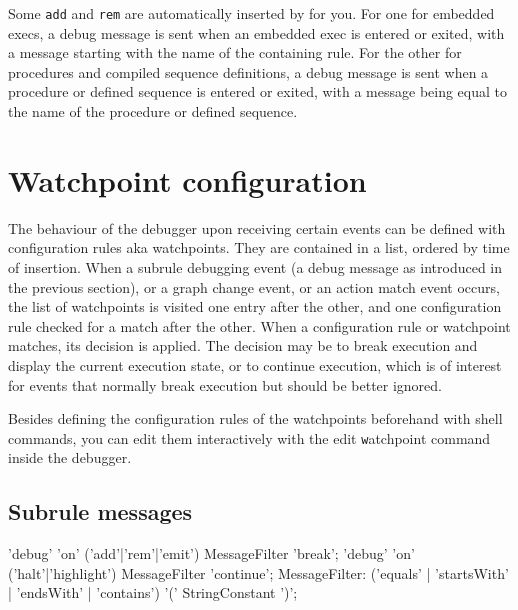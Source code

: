 Some \texttt{add} and \texttt{rem} are automatically inserted by \GrG{} for you.
For one for embedded execs, a debug message is sent when an embedded exec is entered or exited, with a message starting with the name of the containing rule.
For the other for procedures and compiled sequence definitions, a debug message is sent when a procedure or defined sequence is entered or exited, with a message being equal to the name of the procedure or defined sequence.

\section{Watchpoint configuration}

The behaviour of the debugger upon receiving certain events can be defined with configuration rules aka watchpoints.
They are contained in a list, ordered by time of insertion.
When a subrule debugging event (a debug message as introduced in the previous section), or a graph change event, or an action match event occurs,
the list of watchpoints is visited one entry after the other, and one configuration rule checked for a match after the other.
When a configuration rule or watchpoint matches, its decision is applied.
The decision may be to break execution and display the current execution state, or to continue execution, which is of interest for events that normally break execution but should be better ignored.

Besides defining the configuration rules of the watchpoints beforehand with shell commands, you can edit them interactively with the edit \texttt{w}atchpoint command inside the debugger. 

\subsection*{Subrule messages}

\begin{rail}
  'debug' 'on' ('add'|'rem'|'emit') MessageFilter 'break';
  'debug' 'on' ('halt'|'highlight') MessageFilter 'continue';
	MessageFilter: ('equals' | 'startsWith' | 'endsWith' | 'contains') '(' StringConstant ')';
\end{rail}

